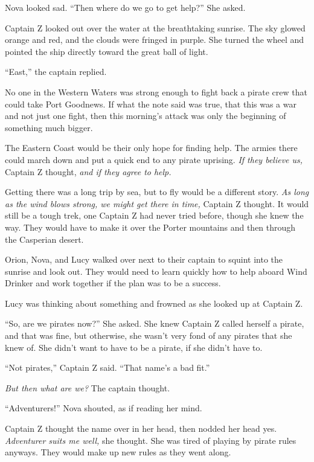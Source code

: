 \documentclass[12pt]{extbook}
\begin{document}
  Nova looked sad. \enquote{Then where do we go to get help?} She asked.
  
  Captain Z looked out over the water at the breathtaking sunrise. The sky
  glowed orange and red, and the clouds were fringed in purple. She turned
  the wheel and pointed the ship directly toward the great ball of light.
  
  \enquote{East,} the captain replied.
  
  No one in the Western Waters was strong enough to fight back a pirate
  crew that could take Port Goodnews. If what the note said was true, that
  this was a war and not just one fight, then this morning's attack was
  only the beginning of something much bigger.
  
  The Eastern Coast would be their only hope for finding help. The armies
  there could march down and put a quick end to any pirate uprising.
  \emph{If they believe us,} Captain Z thought, \emph{and if they agree to
  help.}
  
  Getting there was a long trip by sea, but to fly would be a different
  story. \emph{As long as the wind blows strong, we might get there in
  time,} Captain Z thought. It would still be a tough trek, one Captain Z
  had never tried before, though she knew the way. They would have to make
  it over the Porter mountains and then through the Casperian desert.
  
  Orion, Nova, and Lucy walked over next to their captain to squint into
  the sunrise and look out. They would need to learn quickly how to help
  aboard Wind Drinker and work together if the plan was to be a success.
  
  Lucy was thinking about something and frowned as she looked up at
  Captain Z.
  
  \enquote{So, are we pirates now?} She asked. She knew Captain Z called
  herself a pirate, and that was fine, but otherwise, she wasn't very fond
  of any pirates that she knew of. She didn't want to have to be a pirate,
  if she didn't have to.
  
  \enquote{Not pirates,} Captain Z said. \enquote{That name's a bad fit.}
  
  \emph{But then what are we?} The captain thought.
  
  \enquote{Adventurers!} Nova shouted, as if reading her mind.
  
  Captain Z thought the name over in her head, then nodded her head yes.
  \emph{Adventurer suits me well,} she thought. She was tired of playing
  by pirate rules anyways. They would make up new rules as they went
  along.
  
\end{document}
